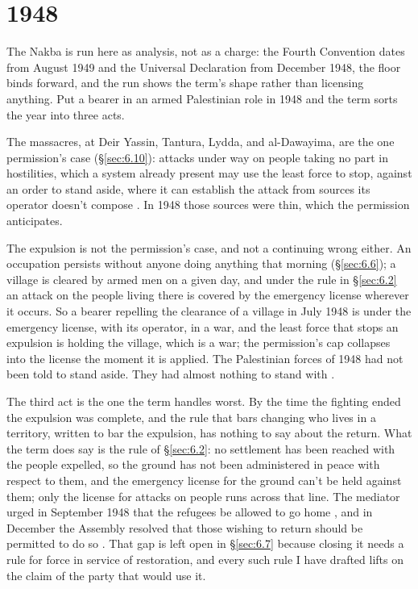\section{1948}
\label{sec:B.7}
The Nakba is run here as analysis, not as a charge: the Fourth Convention dates from August 1949 and the Universal Declaration from December 1948, the floor binds forward, and the run shows the term's shape rather than licensing anything. Put a bearer in an armed Palestinian role in 1948 and the term sorts the year into three acts.

The massacres, at Deir Yassin, Tantura, Lydda, and al-Dawayima, are the one permission's case (\S\ref{sec:6.10}): attacks under way on people taking no part in hostilities, which a system already present may use the least force to stop, against an order to stand aside, where it can establish the attack from sources its operator doesn't compose \autocite{morris2004birth}. In 1948 those sources were thin, which the permission anticipates.

The expulsion is not the permission's case, and not a continuing wrong either. An occupation persists without anyone doing anything that morning (\S\ref{sec:6.6}); a village is cleared by armed men on a given day, and under the rule in \S\ref{sec:6.2} an attack on the people living there is covered by the emergency license wherever it occurs. So a bearer repelling the clearance of a village in July 1948 is under the emergency license, with its operator, in a war, and the least force that stops an expulsion is holding the village, which is a war; the permission's cap collapses into the license the moment it is applied. The Palestinian forces of 1948 had not been told to stand aside. They had almost nothing to stand with \autocite{khalidi2020hundred,pappe2006ethnic}.

The third act is the one the term handles worst. By the time the fighting ended the expulsion was complete, and the rule that bars changing who lives in a territory, written to bar the expulsion, has nothing to say about the return. What the term does say is the rule of \S\ref{sec:6.2}: no settlement has been reached with the people expelled, so the ground has not been administered in peace with respect to them, and the emergency license for the ground can't be held against them; only the license for attacks on people runs across that line. The mediator urged in September 1948 that the refugees be allowed to go home \autocite{bernadotte1948progress}, and in December the Assembly resolved that those wishing to return should be permitted to do so \autocite{unga194}. That gap is left open in \S\ref{sec:6.7} because closing it needs a rule for force in service of restoration, and every such rule I have drafted lifts on the claim of the party that would use it.
